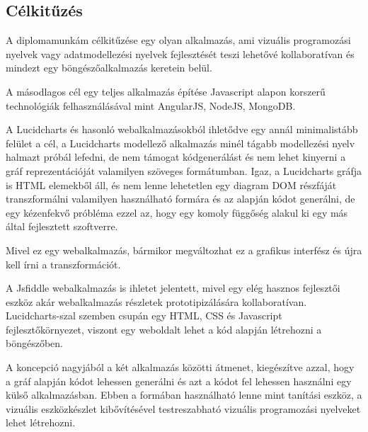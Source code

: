 \subsection{Célkitűzés}

A diplomamunkám célkitűzése egy olyan alkalmazás, ami vizuális programozási nyelvek vagy adatmodellezési nyelvek fejlesztését teszi lehetővé kollaboratívan és mindezt egy böngészőalkalmazás keretein belül.

A másodlagos cél egy teljes alkalmazás építése Javascript alapon korszerű technológiák felhasználásával mint AngularJS, NodeJS, MongoDB.

A Lucidcharts és hasonló webalkalmazásokból ihletődve egy annál minimalistább felület a cél, a Lucidcharts modellező alkalmazás minél tágabb modellezési nyelv halmazt próbál lefedni, de nem támogat kódgenerálást és nem lehet kinyerni a gráf reprezentációját valamilyen szöveges formátumban. Igaz, a Lucidcharts gráfja is HTML elemekből áll, és nem lenne lehetetlen egy diagram DOM részfáját transzformálni valamilyen használható formára és az alapján kódot generálni, de egy kézenfekvő próbléma ezzel az, hogy egy komoly függőség alakul ki egy más által fejlesztett szoftverre.

Mivel ez egy webalkalmazás, bármikor megváltozhat ez a grafikus interfész és újra kell írni a transzformációt. 

A Jsfiddle webalkalmazás is ihletet jelentett, mivel egy elég hasznos fejlesztői eszköz akár webalkalmazás részletek prototipizálására kollaboratívan. Lucidcharts-szal szemben csupán egy HTML, CSS és Javascript fejlesztőkörnyezet, viszont egy weboldalt lehet a kód alapján létrehozni a böngészőben. 


A koncepció nagyjából a két alkalmazás közötti átmenet, kiegészítve azzal, hogy a gráf alapján kódot lehessen generálni és azt a kódot fel lehessen használni egy külső alkalmazásban. Ebben a formában használható lenne mint tanítási eszköz, a vizuális eszközkészlet kibővítésével testreszabható vizuális programozási nyelveket lehet létrehozni.

